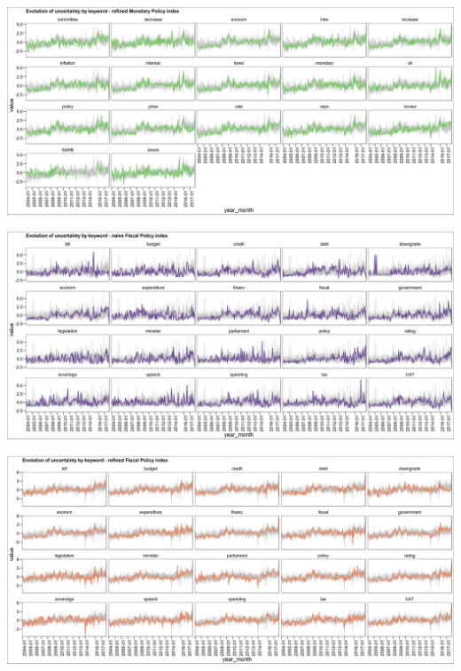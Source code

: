 \documentclass[11pt,preprint, authoryear]{elsarticle}
\let\origfigure\figure
\let\endorigfigure\endfigure
\renewenvironment{figure}[1][2] {
    \expandafter\origfigure\expandafter[H]
} {
    \endorigfigure
}
\numberwithin{equation}{section}
\numberwithin{figure}{section}
\numberwithin{table}{section}
\begin{document}
\begin{figure}
	\centering
	\includegraphics[width=\linewidth, keepaspectratio]{bin/monetary_key_refine}\\
	
	\caption{Composite Monetary Policy uncertainty refined index. \label{fig_mon_key_r}}
\end{figure}

\begin{figure}
	\centering
	\includegraphics[width=\linewidth, keepaspectratio]{bin/fiscal_key_naive}\\
	
	\caption{Composite Fiscal Policy uncertainty naive index. \label{fig_fis_key_n}}
\end{figure}

\begin{figure}
	\centering
	\includegraphics[width=\linewidth, keepaspectratio]{bin/fiscal_key_refine}\\
	
	\caption{Composite Fiscal Policy uncertainty refined index. \label{fig_fis_key_r}}
\end{figure}
\end{document}
